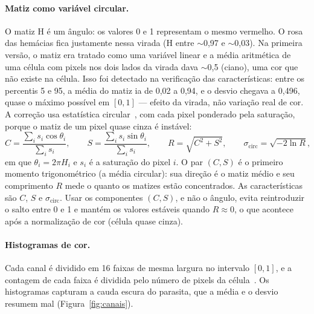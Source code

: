 \documentclass[11pt,a4paper]{article}
\begin{document}
\paragraph{Matiz como variável circular.}\label{sec:matiz} O matiz H é um ângulo: os valores 0 e 1
representam o mesmo vermelho. O rosa das hemácias fica justamente nessa virada (H entre $\sim$0,97 e
$\sim$0,03). Na primeira versão, o matiz era tratado como uma variável linear e a média aritmética de
uma célula com pixels nos dois lados da virada dava $\sim$0,5 (ciano), uma cor que não existe na
célula. Isso foi detectado na verificação das características: entre os percentis 5 e 95, a média
do matiz ia de 0,02 a 0,94, e o desvio chegava a 0,496, quase o máximo possível em $[0,1]$ --- efeito
da virada, não variação real de cor. A correção usa estatística circular~\cite{mardia2000}, com cada pixel ponderado pela
saturação, porque o matiz de um pixel quase cinza é instável:
\begin{equation}
  C = \frac{\sum_i s_i \cos\theta_i}{\sum_i s_i},\qquad
  S = \frac{\sum_i s_i \sin\theta_i}{\sum_i s_i},\qquad
  R = \sqrt{C^2+S^2},\qquad
  \sigma_{\text{circ}} = \sqrt{-2\ln R},
\end{equation}
em que $\theta_i = 2\pi H_i$ e $s_i$ é a saturação do pixel $i$. O par $(C,S)$ é o primeiro momento
trigonométrico (a média circular): sua direção é o matiz médio e seu comprimento $R$ mede o quanto os
matizes estão concentrados. As características são $C$, $S$ e $\sigma_{\text{circ}}$. Usar os
componentes $(C,S)$, e não o ângulo, evita reintroduzir o salto entre 0 e 1 e mantém os valores
estáveis quando $R\approx0$, o que acontece após a normalização de cor (célula quase cinza).

\paragraph{Histogramas de cor.} Cada canal é dividido em 16 faixas de mesma largura no intervalo
$[0,1]$, e a contagem de cada faixa é dividida pelo número de pixels da célula~\cite{swain1991}. Os
histogramas capturam a cauda escura do parasita, que a média e o desvio resumem mal
(Figura~\ref{fig:canais}).
\end{document}
